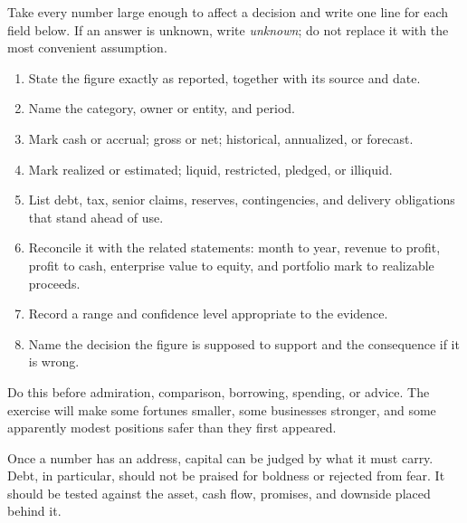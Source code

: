 Take every number large enough to affect a decision and write one line for each
field below. If an answer is unknown, write \emph{unknown}; do not replace it
with the most convenient assumption.

\begin{enumerate}[itemsep=0.13em]
\item State the figure exactly as reported, together with its source and date.
\item Name the category, owner or entity, and period.
\item Mark cash or accrual; gross or net; historical, annualized, or forecast.
\item Mark realized or estimated; liquid, restricted, pledged, or illiquid.
\item List debt, tax, senior claims, reserves, contingencies, and delivery
  obligations that stand ahead of use.
\item Reconcile it with the related statements: month to year, revenue to
  profit, profit to cash, enterprise value to equity, and portfolio mark to
  realizable proceeds.
\item Record a range and confidence level appropriate to the evidence.
\item Name the decision the figure is supposed to support and the consequence
  if it is wrong.
\end{enumerate}

Do this before admiration, comparison, borrowing, spending, or advice. The
exercise will make some fortunes smaller, some businesses stronger, and some
apparently modest positions safer than they first appeared.

Once a number has an address, capital can be judged by what it must carry.
Debt, in particular, should not be praised for boldness or rejected from fear.
It should be tested against the asset, cash flow, promises, and downside placed
behind it.
